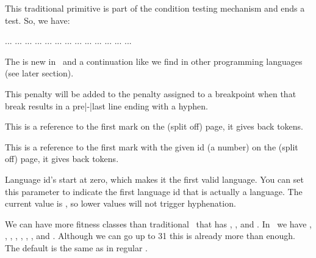 \stopoldprimitive

\startoldprimitive[title={\prm {fi}}]

This traditional primitive is part of the condition testing mechanism and ends a
test. So, we have:

\starttyping
\ifsomething ... \else ... \fi
\ifsomething ... \or ... \or ... \else ... \fi
\ifsomething ... \orelse \ifsometing  ... \else ... \fi
\ifsomething ... \or ... \orelse \ifsometing  ... \else ... \fi
\stoptyping

The  is new in \LUAMETATEX\ and a continuation like we find in
other programming languages (see later section).

\stopoldprimitive

\startoldprimitive[title={\prm {finalhyphendemerits}}]

This penalty will be added to the penalty assigned to a breakpoint when that
break results in a pre|-|last line ending with a hyphen.

\stopoldprimitive

\startoldprimitive[title={\prm {firstmark}}][obsolete=yes]

This is a reference to the first mark on the (split off) page, it gives back
tokens.

\stopoldprimitive

\startoldprimitive[title={\prm {firstmarks}}]

This is a reference to the first mark with the given id (a number) on the (split
off) page, it gives back tokens.

\stopoldprimitive

\startnewprimitive[title={\prm {firstvalidlanguage}}]

Language id's start at zero, which makes it the first valid language. You can set
this parameter to indicate the first language id that is actually a language. The
current value is \the \firstvalidlanguage, so lower values will not trigger
hyphenation.

\stopnewprimitive

\startnewprimitive[title={\prm {fitnessclasses}}]

We can have more fitness classes than traditional \TEX\ that has , ,  and . In \CONTEXT\ we have
, , , ,
, , ,  and
. Although we can go up to 31 this is already more than enough.
The default is the same as in regular \TEX.

